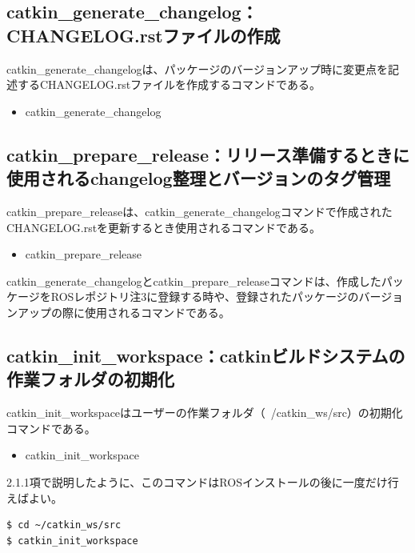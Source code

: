 \subsection{catkin\_generate\_changelog：CHANGELOG.rstファイルの作成}

catkin\_generate\_changelogは、パッケージのバージョンアップ時に変更点を記述するCHANGELOG.rstファイルを作成するコマンドである。

\begin{itemize}
\item catkin\_generate\_changelog
\end{itemize}

\subsection{catkin\_prepare\_release：リリース準備するときに使用されるchangelog整理とバージョンのタグ管理}

catkin\_prepare\_releaseは、catkin\_generate\_changelogコマンドで作成されたCHANGELOG.rstを更新するとき使用されるコマンドである。

\begin{itemize}
\item catkin\_prepare\_release
\end{itemize}

catkin\_generate\_changelogとcatkin\_prepare\_releaseコマンドは、作成したパッケージをROSレポジトリ注3に登録する時や、登録されたパッケージのバージョンアップの際に使用されるコマンドである。

\subsection{catkin\_init\_workspace：catkinビルドシステムの作業フォルダの初期化}

catkin\_init\_workspaceはユーザーの作業フォルダ（~/catkin\_ws/src）の初期化コマンドである。

\begin{itemize}
\item catkin\_init\_workspace
\end{itemize}

2.1.1項で説明したように、このコマンドはROSインストールの後に一度だけ行えばよい。

\begin{lstlisting}[language=ROS]
$ cd ~/catkin_ws/src
$ catkin_init_workspace
\end{lstlisting}

